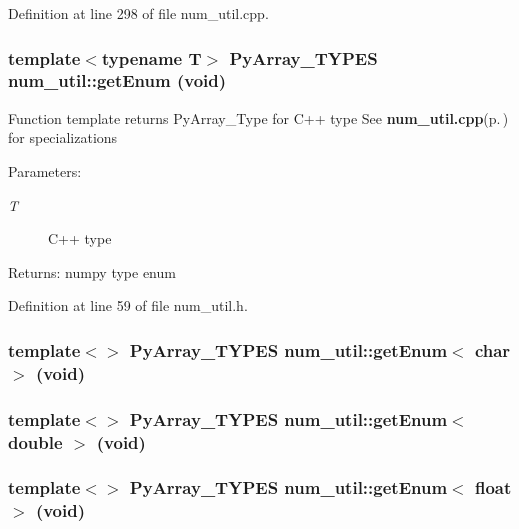 Definition at line 298 of file num\_\-util.cpp.
\subsubsection{\setlength{\rightskip}{0pt plus 5cm}template$<$typename T$>$ Py\-Array\_\-TYPES num\_\-util::get\-Enum (void)}\label{namespacenum__util_a61}


Function template returns Py\-Array\_\-Type for C++ type See {\bf num\_\-util.cpp}{\rm (p.\,\pageref{num__util_8cpp})} for specializations \begin{Desc}
\item[Parameters:]
\begin{description}
\item[{\em T}]C++ type \end{description}
\end{Desc}
\begin{Desc}
\item[Returns:]numpy type enum\end{Desc}


Definition at line 59 of file num\_\-util.h.
\subsubsection{\setlength{\rightskip}{0pt plus 5cm}template$<$$>$ Py\-Array\_\-TYPES num\_\-util::get\-Enum$<$ char $>$ (void)}\label{namespacenum__util_a12}


\subsubsection{\setlength{\rightskip}{0pt plus 5cm}template$<$$>$ Py\-Array\_\-TYPES num\_\-util::get\-Enum$<$ double $>$ (void)}\label{namespacenum__util_a24}


\subsubsection{\setlength{\rightskip}{0pt plus 5cm}template$<$$>$ Py\-Array\_\-TYPES num\_\-util::get\-Enum$<$ float $>$ (void)}\label{namespacenum__util_a23}


